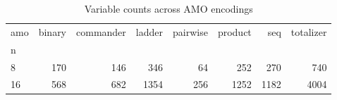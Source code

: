 \begin{table}
\caption{Variable counts across AMO encodings}
\begin{tabular}{lrrrrrrr}
\toprule
amo & binary & commander & ladder & pairwise & product & seq & totalizer \\
n &  &  &  &  &  &  &  \\
\midrule
8 & 170 & 146 & 346 & 64 & 252 & 270 & 740 \\
16 & 568 & 682 & 1354 & 256 & 1252 & 1182 & 4004 \\
\bottomrule
\end{tabular}
\end{table}
